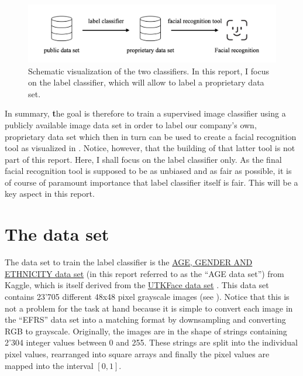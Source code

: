 \documentclass{article}
\begin{document}
\begin{figure}[t!]
  \centering
  \includegraphics[width=\textwidth]{imgs/ClassifierPipeline.png}
  \caption{Schematic visualization of the two classifiers. In this report, I focus on the label classifier, which will allow to label a proprietary data set.}
  \label{fig:integrationscheme}
\end{figure}
\FloatBarrier

In summary, {\textbf the goal} is therefore to train a supervised image classifier using a publicly available image data set in order to label our company's own, proprietary data set which then in turn can be used to create a facial recognition tool as visualized in . Notice, however, that the building of that latter tool is not part of this report. Here, I shall focus on the label classifier only. As the final facial recognition tool is supposed to be as unbiased and as fair as possible, it is of course of paramount importance that label classifier itself is fair. This will be a key aspect in this report.

\section{The data set}
The data set to train the label classifier is the \href{https://www.kaggle.com/datasets/nipunarora8/age-gender-and-ethnicity-face-data-csv}{AGE, GENDER AND ETHNICITY data set} (in this report referred to as the ``AGE data set'') from Kaggle, which is itself derived from the \href{https://archive.org/details/UTKFace}{UTKFace data set} \citep{zhifei2017cvpr}. This data set contains 23'705 different 48x48 pixel grayscale images (see ). Notice that this is not a problem for the task at hand because it is simple to convert each image in the ``EFRS'' data set into a matching format by downsampling and converting RGB to grayscale. Originally, the images are in the shape of strings containing 2'304 integer values between 0 and 255. These strings are split into the individual pixel values, rearranged into square arrays and finally the pixel values are mapped into the interval $[0,1]$.
\end{document}
